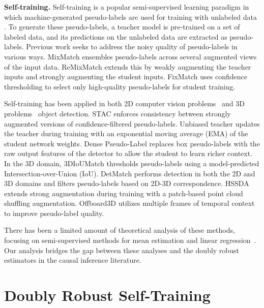 \textbf{Self-training.}
Self-training is a popular semi-supervised learning paradigm in which machine-generated pseudo-labels are used for training with unlabeled data \citep{pseudolabel2013,berthelot2019mixmatch,berthelot2019remixmatch,sohn2020fixmatch, zhao2023towards}. To generate these pseudo-labels, a teacher model is pre-trained on a set of labeled data, and its predictions on the unlabeled data are extracted as pseudo-labels. Previous work seeks to address the noisy quality of pseudo-labels in various ways. MixMatch \citep{berthelot2019mixmatch} ensembles pseudo-labels across several augmented views of the input data. ReMixMatch \citep{berthelot2019remixmatch} extends this by weakly augmenting the teacher inputs and strongly augmenting the student inputs. FixMatch \citep{sohn2020fixmatch} uses confidence thresholding to select only high-quality pseudo-labels for student training.

Self-training has  been applied in  both 2D computer vision problems~\citep{liu2021unbiased,NEURIPS2019_d0f4dae8,Tang2021HumbleTT,sohn2020detection,zhou2022} and 3D problems~\citep{park2022detmatch,wang20213dioumatch,li2023dds3d,liu2023hierarchical} object detection. STAC \citep{sohn2020detection} enforces consistency between strongly augmented versions of confidence-filtered pseudo-labels. Unbiased teacher \citep{liu2021unbiased} updates the teacher during training with an exponential moving average (EMA) of the student network weights. Dense Pseudo-Label \citep{zhou2022} replaces box pseudo-labels with the raw output features of the detector to allow the student to learn richer context. In the 3D domain, 3DIoUMatch \citep{wang20213dioumatch} thresholds pseudo-labels using a model-predicted Intersection-over-Union (IoU). DetMatch \citep{park2022detmatch} performs detection in both the 2D and 3D domains and filters pseudo-labels based on 2D-3D correspondence. HSSDA \citep{liu2023hierarchical} extends strong augmentation during training with a patch-based point cloud shuffling augmentation. Offboard3D \citep{qi2021offboard} utilizes multiple frames of temporal context to improve pseudo-label quality.

There has been a limited amount of theoretical analysis of these methods, focusing on semi-supervised methods for mean estimation and linear regression~\citep{zhang2019semi, azriel2022semi}. Our analysis bridges the gap between these analyses and the doubly robust estimators in the causal inference literature. 

 

\section{Doubly Robust Self-Training}

